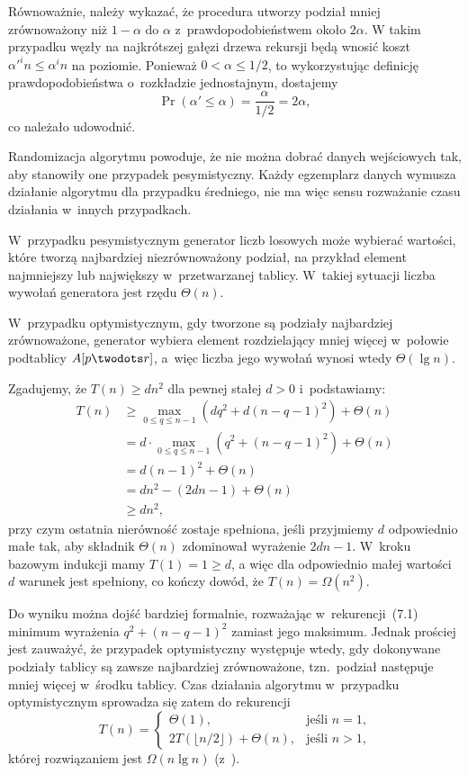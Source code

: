 \exercise %
Równoważnie, należy wykazać, że procedura  utworzy podział mniej zrównoważony niż $1-\alpha$ do $\alpha$ z~prawdopodobieństwem około $2\alpha$. W takim przypadku węzły na najkrótszej gałęzi drzewa rekursji będą wnosić koszt $\alpha'^in\le\alpha^in$ na  poziomie. Ponieważ $0<\alpha\le1/2$, to wykorzystując definicję prawdopodobieństwa o~rozkładzie jednostajnym, dostajemy
\[
	\Pr(\alpha'\le\alpha) = \frac{\alpha}{1/2} = 2\alpha,
\]
co należało udowodnić.


\exercise %
Randomizacja algorytmu powoduje, że nie można dobrać danych wejściowych tak, aby stanowiły one przypadek pesymistyczny. Każdy egzemplarz danych wymusza działanie algorytmu dla przypadku średniego, nie ma więc sensu rozważanie czasu działania w~innych przypadkach.

\exercise %
W~przypadku pesymistycznym generator liczb losowych może wybierać wartości, które tworzą najbardziej niezrównoważony podział, na przykład element najmniejszy lub największy w~przetwarzanej tablicy. W~takiej sytuacji liczba wywołań generatora jest rzędu $\Theta(n)$.

W~przypadku optymistycznym, gdy tworzone są podziały najbardziej zrównoważone, generator wybiera element rozdzielający mniej więcej w~połowie podtablicy $A[p\twodots r]$, a~więc liczba jego wywołań wynosi wtedy $\Theta(\lg n)$.


\exercise %
Zgadujemy, że $T(n)\ge dn^2$ dla pewnej stałej $d>0$ i~podstawiamy:
\begin{align*}
	T(n) &\ge \max_{0\le q\le n-1}(dq^2+d(n-q-1)^2)+\Theta(n) \\
	&= d\cdot\max_{0\le q\le n-1}(q^2+(n-q-1)^2)+\Theta(n) \\
	&= d(n-1)^2+\Theta(n) \\
	&= dn^2-(2dn-1)+\Theta(n) \\
	&\ge dn^2,
\end{align*}
przy czym ostatnia nierówność zostaje spełniona, jeśli przyjmiemy $d$ odpowiednio małe tak, aby składnik $\Theta(n)$ zdominował wyrażenie $2dn-1$. W~kroku bazowym indukcji mamy $T(1)=1\ge d$, a więc dla odpowiednio małej wartości $d$ warunek jest spełniony, co kończy dowód, że $T(n)=\Omega(n^2)$.

\exercise %
Do wyniku można dojść bardziej formalnie, rozważając w~rekurencji~(7.1) minimum wyrażenia $q^2+(n-q-1)^2$ zamiast jego maksimum. Jednak prościej jest zauważyć, że przypadek optymistyczny występuje wtedy, gdy dokonywane podziały tablicy są zawsze najbardziej zrównoważone, tzn.\ podział następuje mniej więcej w~środku tablicy. Czas działania algorytmu w~przypadku optymistycznym sprowadza się zatem do rekurencji
\[
	T(n) = \begin{cases}
		\Theta(1), & \text{jeśli $n=1$,} \\
		2T(\lfloor n/2\rfloor)+\Theta(n), & \text{jeśli $n>1$,}
	\end{cases}
\]
której rozwiązaniem jest $\Omega(n\lg n)$ (z~).

